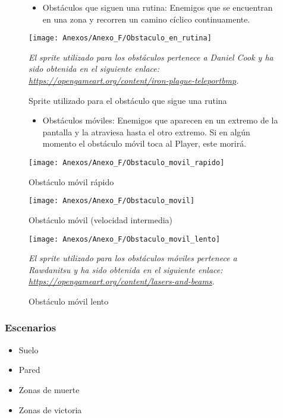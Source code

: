 \begin{figure}[h]
\begin{itemize}
\item
Obstáculos que siguen una rutina: Enemigos que se encuentran en una zona y recorren un camino cíclico continuamente.
\end{itemize}
\centering
\texttt{[image: Anexos/Anexo\_F/Obstaculo\_en\_rutina]}
\caption{Sprite utilizado para el obstáculo que sigue una rutina}
\raggedright
\textit{El sprite utilizado para los obstáculos pertenece a Daniel Cook y ha sido obtenida en el siguiente enlace: \url{https://opengameart.org/content/iron-plague-teleportbmp}.}
\end{figure}

\begin{figure}[h]
\begin{itemize}
\item
Obstáculos móviles: Enemigos que aparecen en un extremo de la pantalla y la atraviesa hasta el otro extremo. Si en algún momento el obstáculo móvil toca al Player, este morirá.
\end{itemize}
\centering
\texttt{[image: Anexos/Anexo\_F/Obstaculo\_movil\_rapido]}
\caption{Obstáculo móvil rápido}
\end{figure}

\begin{figure}[h]
\centering
\texttt{[image: Anexos/Anexo\_F/Obstaculo\_movil]}
\caption{Obstáculo móvil (velocidad intermedia)}
\end{figure}

\begin{figure}[h]
\centering
\texttt{[image: Anexos/Anexo\_F/Obstaculo\_movil\_lento]}
\caption{Obstáculo móvil lento}
\raggedright
\textit{El sprite utilizado para los obstáculos móviles pertenece a Rawdanitsu y ha sido obtenida en el siguiente enlace: \url{https://opengameart.org/content/lasers-and-beams}.}
\end{figure}
\clearpage

\subsubsection{Escenarios}
\begin{itemize}
\item
Suelo
\item
Pared
\item
Zonas de muerte
\item
Zonas de victoria
\end{itemize}

